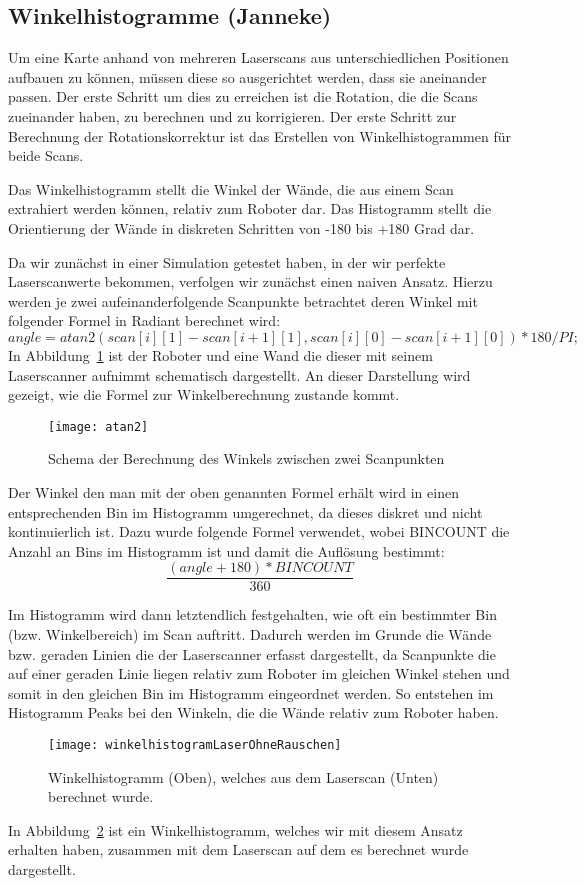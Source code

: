 \subsection{Winkelhistogramme (Janneke)}
\label{sec:winkelhistogramme}

Um eine Karte anhand von mehreren Laserscans aus unterschiedlichen Positionen aufbauen zu können, müssen diese so ausgerichtet werden, dass sie aneinander passen. Der erste Schritt um dies zu erreichen ist die Rotation, die die Scans zueinander haben, zu berechnen und zu korrigieren. Der erste Schritt zur Berechnung der Rotationskorrektur ist das Erstellen von Winkelhistogrammen für beide Scans.

Das Winkelhistogramm stellt die Winkel der Wände, die aus einem Scan extrahiert werden können, relativ zum Roboter dar. Das Histogramm stellt die Orientierung der Wände in diskreten Schritten von -180 bis +180 Grad dar.

Da wir zunächst in einer Simulation getestet haben, in der wir perfekte Laserscanwerte bekommen, verfolgen wir zunächst einen naiven Ansatz. Hierzu werden je zwei aufeinanderfolgende Scanpunkte betrachtet deren Winkel mit folgender Formel in Radiant berechnet wird: $$angle = atan2(scan[i][1] - scan[i+1][1], scan[i][0] - scan[i+1][0]) * 180 /PI;$$ In Abbildung~\ref{fig:Winkelberechnung} ist der Roboter und eine Wand die dieser mit seinem Laserscanner aufnimmt schematisch dargestellt. An dieser Darstellung wird gezeigt, wie die Formel zur Winkelberechnung zustande kommt.

\begin{figure}
	\centering
	\texttt{[image: atan2]}
	\caption{Schema der Berechnung des Winkels zwischen zwei Scanpunkten}
	\label{fig:Winkelberechnung}
\end{figure}

Der Winkel den man mit der oben genannten Formel erhält wird in einen entsprechenden Bin im Histogramm umgerechnet, da dieses diskret und nicht kontinuierlich ist. Dazu wurde folgende Formel verwendet, wobei BINCOUNT die Anzahl an Bins im Histogramm ist und damit die Auflösung bestimmt: $$\frac{(angle + 180) * BINCOUNT}{360}$$

Im Histogramm wird dann letztendlich festgehalten, wie oft ein bestimmter Bin (bzw. Winkelbereich) im Scan auftritt. Dadurch werden im Grunde die Wände bzw. geraden Linien die der Laserscanner erfasst dargestellt, da Scanpunkte die auf einer geraden Linie liegen relativ zum Roboter im gleichen Winkel stehen und somit in den gleichen Bin im Histogramm eingeordnet werden. So entstehen im Histogramm Peaks bei den Winkeln, die die Wände relativ zum Roboter haben.

\begin{figure}
	\centering
	\texttt{[image: winkelhistogramLaserOhneRauschen]}
	\caption{Winkelhistogramm (Oben), welches aus dem Laserscan (Unten) berechnet wurde.}
	\label{fig:Winkelhistogramm}
\end{figure}

In Abbildung~\ref{fig:Winkelhistogramm} ist ein Winkelhistogramm, welches wir mit diesem Ansatz erhalten haben, zusammen mit dem Laserscan auf dem es berechnet wurde dargestellt.